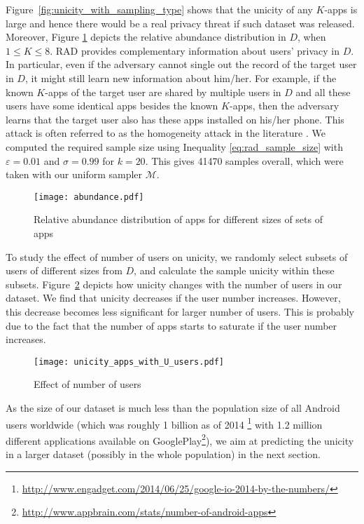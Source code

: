 \documentclass{acm_proc_article-sp}
\theoremstyle{plain}
\theoremstyle{plain}
\theoremstyle{plain}
\theoremstyle{plain}
\theoremstyle{plain}
\theoremstyle{plain}
\begin{document}
Figure~\ref{fig:unicity_with_sampling_type} shows that the unicity of any $K$-apps is large and hence there would be a real privacy threat if such dataset was released.
Moreover, Figure \ref{fig:relative_abundance} depicts the relative abundance distribution in $D$, when $1 \leq K \leq 8$. RAD provides complementary information about users' privacy in $D$. In particular, even if the adversary cannot single out the record of the  target user in $D$, it might still learn new information about him/her. For example, if the known $K$-apps of the target user are shared by multiple users in $D$ and all these users have some identical apps besides the known $K$-apps, then the adversary learns that the target user also has these apps installed on his/her phone. This attack is often referred to as the homogeneity attack in the literature \cite{MachanavajjhalaKGV07}. We computed the required sample size using Inequality \ref{eq:rad_sample_size} with $\varepsilon = 0.01$ and $\sigma=0.99$ for $k=20$. This gives 41470 samples overall, which were taken with our uniform sampler $\mathcal{M}$.

\begin{figure}[h]
	\texttt{[image: abundance.pdf]}
	\caption{Relative abundance distribution of apps for different sizes of sets of apps}
	\label{fig:relative_abundance}
\end{figure}



To study the effect of number of users on unicity, we randomly select subsets of users of different sizes from $D$, and calculate the sample unicity within these subsets. 
Figure~\ref{fig:unicity_changes_with_users} depicts how unicity changes with the number of users in our dataset.
We find that unicity decreases if the user number increases.
However, this decrease becomes less significant for larger number of users.
This is probably due to the fact that the number of apps starts to saturate if the user number increases.
\begin{figure}[!t]
        \centering
	\texttt{[image: unicity\_apps\_with\_U\_users.pdf]}
	\caption{Effect of number of users}
	\label{fig:unicity_changes_with_users}
\end{figure}


As the size of our dataset is much less than the population size of all Android users worldwide (which was roughly 1 billion as of 2014 \footnote{\url{http://www.engadget.com/2014/06/25/google-io-2014-by-the-numbers/}} with 1.2 million different applications available on GooglePlay\footnote{\url{http://www.appbrain.com/stats/number-of-android-apps}}), we aim at predicting the unicity in a larger dataset (possibly in the whole population) in the next section. 
\end{document}
